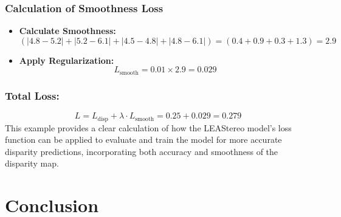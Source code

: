 \documentclass[22pt]{report}
\begin{document}
\subsection*{Calculation of Smoothness Loss}
\begin{itemize}
    \item \textbf{Calculate Smoothness:}
            \[
            \left( |4.8 - 5.2| + |5.2 - 6.1| + |4.5 - 4.8| + |4.8 - 6.1| \right) = \left( 0.4 + 0.9 + 0.3 + 1.3 \right) = 2.9
            \]

    \item \textbf{Apply Regularization:}
            \[
            L_{\text{smooth}} = 0.01 \times 2.9 = 0.029
            \]
\end{itemize}
\subsection*{Total Loss:}
        \[
        L = L_{\text{disp}} + \lambda \cdot L_{\text{smooth}} = 0.25 + 0.029 = 0.279
        \]
\vspace{12}
This example provides a clear calculation of how the LEAStereo model's loss function can be applied to evaluate and train the model for more accurate disparity predictions, incorporating both accuracy and smoothness of the disparity map.


\chapter{Conclusion}
\end{document}
